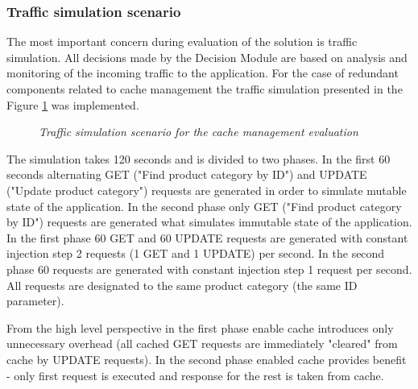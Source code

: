 \documentclass[10pt,a4paper]{article}
\begin{document}
\subsubsection{Traffic simulation scenario} \label{trafficcachesim}

The most important concern during evaluation of the solution is traffic simulation. All decisions made by the Decision Module are based on analysis and monitoring of the incoming traffic to the application. For the case of redundant components related to cache management the traffic simulation presented in the Figure \ref{trafficcache} was implemented.

\begin{figure}[!htb]
\caption{\textit{Traffic simulation scenario for the cache management evaluation}} \label{trafficcache}
\end{figure}

The simulation takes 120 seconds and is divided to two phases. In the first 60 seconds alternating GET ("Find product category by ID") and UPDATE ("Update product category") requests are generated in order to simulate mutable state of the application. In the second phase only GET ("Find product category by ID") requests are generated what simulates immutable state of the application. In the first phase 60 GET and 60 UPDATE requests are generated with constant injection step 2 requests (1 GET and 1 UPDATE) per second. In the second phase 60 requests are generated with constant injection step 1 request per second. All requests are designated to the same product category (the same ID parameter). 

From the high level perspective in the first phase enable cache introduces only unnecessary overhead (all cached GET requests are immediately "cleared" from cache by UPDATE requests). In the second phase enabled cache provides benefit - only first request is executed and response for the rest is taken from cache.  
\end{document}
